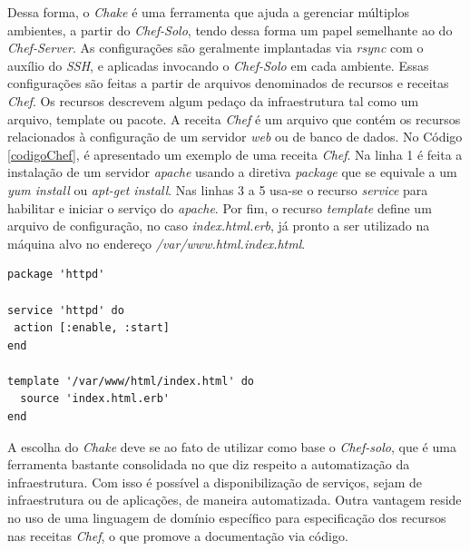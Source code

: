 Dessa forma, o \textit{Chake} é uma ferramenta que ajuda a gerenciar múltiplos ambientes, a partir do \textit{Chef-Solo}, tendo dessa forma um papel semelhante ao do \textit{Chef-Server}. As configurações são geralmente implantadas via \textit{rsync} com o auxílio do \textit{SSH}, e aplicadas invocando o \textit{Chef-Solo} em cada ambiente. Essas configurações são feitas a partir de arquivos denominados de recursos e receitas \textit{Chef}. Os recursos descrevem algum pedaço da infraestrutura tal como um arquivo, template ou pacote. A receita \textit{Chef} é um arquivo que contém os recursos relacionados à configuração de um servidor \textit{web} ou de banco de dados. No Código \ref{codigoChef}, é apresentado um exemplo de uma receita \textit{Chef}. Na linha 1 é feita a instalação de um servidor \textit{apache} usando a diretiva \textit{package} que se equivale a um \textit{yum install} ou \textit{apt-get install}. Nas linhas 3 a 5 usa-se o recurso \textit{service} para habilitar e iniciar o serviço do \textit{apache}. Por fim, o recurso \textit{template} define um arquivo de configuração, no caso \textit{index.html.erb}, já pronto a ser utilizado na máquina alvo no endereço \textit{/var/www.html.index.html}.

\begin{lstlisting}[caption={Código exemplo de uma receita Chef}, label=codigoChef]
package 'httpd'

service 'httpd' do
 action [:enable, :start]
end

template '/var/www/html/index.html' do
  source 'index.html.erb'
end
\end{lstlisting}

A escolha do \textit{Chake} deve se ao fato de utilizar como base o \textit{Chef-solo}, que é uma ferramenta bastante consolidada no que diz respeito a automatização da infraestrutura. Com isso é possível a disponibilização de serviços, sejam de infraestrutura ou de aplicações, de maneira automatizada. Outra vantagem reside no uso de uma linguagem de domínio específico para especificação dos recursos nas receitas \textit{Chef}, o que promove a documentação via código.

